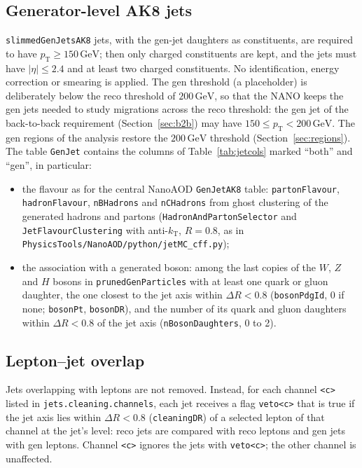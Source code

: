 \documentclass[11pt]{article}
\newcommand{\pt}{p_{\mathrm{T}}}
\newcommand{\GeV}{\ensuremath{\,\mathrm{GeV}}}
\newcommand{\code}[1]{\texttt{#1}}
\begin{document}
\subsection{Generator-level AK8 jets}
\label{sec:genjets}
\code{slimmedGenJetsAK8} jets, with the gen-jet daughters as constituents, are required to have $\pt \geq 150\GeV$;
then only charged constituents are kept, and the jets must have $|\eta| \leq 2.4$ and at least two charged
constituents. No identification, energy correction or smearing is applied. The gen threshold (a placeholder) is
deliberately below the reco threshold of $200\GeV$, so that the NANO keeps the gen jets needed to study migrations
across the reco threshold: the gen jet of the back-to-back requirement (Section~\ref{sec:b2b}) may have
$150 \leq \pt < 200\GeV$. The gen regions of the analysis restore the $200\GeV$ threshold
(Section~\ref{sec:regions}). The table \code{GenJet} contains
the columns of Table~\ref{tab:jetcols} marked ``both'' and ``gen'', in particular:
\begin{itemize}
\item the flavour as for the central NanoAOD \code{GenJetAK8} table: \code{partonFlavour}, \code{hadronFlavour},
  \code{nBHadrons} and \code{nCHadrons} from ghost clustering of the generated hadrons and partons
  (\code{HadronAndPartonSelector} and \code{JetFlavourClustering} with anti-$k_\mathrm{T}$, $R = 0.8$, as in
  \code{PhysicsTools/NanoAOD/python/jetMC\_cff.py});
\item the association with a generated boson: among the last copies of the $W$, $Z$ and $H$ bosons in
  \code{prunedGenParticles} with at least one quark or gluon daughter, the one closest to the jet axis within
  $\Delta R < 0.8$ (\code{bosonPdgId}, 0 if none; \code{bosonPt}, \code{bosonDR}), and the number of its quark and
  gluon daughters within $\Delta R < 0.8$ of the jet axis (\code{nBosonDaughters}, 0 to 2).
\end{itemize}

\subsection{Lepton--jet overlap}
\label{sec:veto}
Jets overlapping with leptons are not removed. Instead, for each channel \code{<c>} listed in
\code{jets.cleaning.channels}, each jet receives a flag \code{veto<c>} that is true if the jet axis lies within
$\Delta R < 0.8$ (\code{cleaningDR}) of a selected lepton of that channel at the jet's level: reco jets are compared
with reco leptons and gen jets with gen leptons. Channel \code{<c>} ignores the jets with \code{veto<c>}; the other
channel is unaffected.
\end{document}
